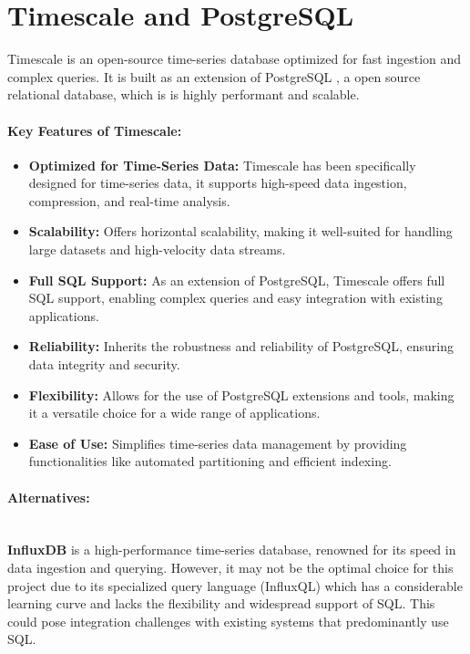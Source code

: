 \section{Timescale and PostgreSQL}
\label{section:timescale_docker}

Timescale \cite{Timescale} is an open-source time-series database optimized for fast ingestion and complex queries. It is built as an extension of PostgreSQL \cite{PostgreSQL}, a open source relational database, which is is highly performant and scalable. 

\paragraph{Key Features of Timescale:}
\begin{itemize}
    \item \textbf{Optimized for Time-Series Data:} Timescale has been specifically designed for time-series data, it supports high-speed data ingestion, compression, and real-time analysis.
    \item \textbf{Scalability:} Offers horizontal scalability, making it well-suited for handling large datasets and high-velocity data streams.
    \item \textbf{Full SQL Support:} As an extension of PostgreSQL, Timescale offers full SQL support, enabling complex queries and easy integration with existing applications.
    \item \textbf{Reliability:} Inherits the robustness and reliability of PostgreSQL, ensuring data integrity and security.
    \item \textbf{Flexibility:} Allows for the use of PostgreSQL extensions and tools, making it a versatile choice for a wide range of applications.
    \item \textbf{Ease of Use:} Simplifies time-series data management by providing functionalities like automated partitioning and efficient indexing. 
\end{itemize}

\paragraph{Alternatives:} \mbox{} \\ 
\textbf{InfluxDB} \cite{InfluxDataDocs} is a high-performance time-series database, renowned for its speed in data ingestion and querying. However, it may not be the optimal choice for this project due to its specialized query language (InfluxQL) which has a considerable learning curve and lacks the flexibility and widespread support of SQL. This could pose integration challenges with existing systems that predominantly use SQL. \\

